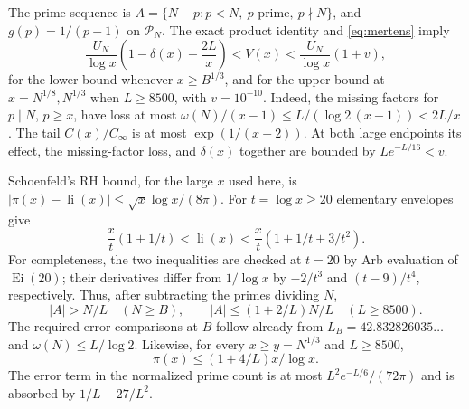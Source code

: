 \documentclass[11pt]{article}
\newcommand{\PP}{\mathcal P_N}
\newcommand{\li}{\operatorname{li}}
\newcommand{\om}{\omega}
\begin{document}
The prime sequence is
$A=\{N-p:p<N,\ p\text{ prime},\ p\nmid N\}$,
and $g(p)=1/(p-1)$ on $\PP$.
The exact product identity and \eqref{eq:mertens} imply
\begin{equation}\label{eq:Vbounds}
\frac{U_N}{\log x}
\left(1-\delta(x)-\frac{2L}{x}\right)
<V(x)
<\frac{U_N}{\log x}(1+v),
\end{equation}
for the lower bound whenever $x\ge B^{1/3}$, and for the upper
bound at $x=N^{1/8},N^{1/3}$ when $L\ge8500$, with $v=10^{-10}$.
Indeed, the missing factors for $p\mid N$, $p\ge x$, have loss
at most $\om(N)/(x-1)\le L/(\log2\,(x-1))<2L/x$.
The tail $C(x)/C_\infty$ is at most $\exp(1/(x-2))$.
At both large endpoints its effect, the missing-factor loss, and
$\delta(x)$ together are bounded by $Le^{-L/16}<v$.

Schoenfeld's RH bound, for the large $x$ used here, is
$|\pi(x)-\li(x)|\le\sqrt x\log x/(8\pi)$.
For $t=\log x\ge20$ elementary envelopes give
\[
\frac{x}{t}(1+1/t)<\li(x)<\frac{x}{t}(1+1/t+3/t^2).
\]
For completeness, the two inequalities are checked at $t=20$ by
Arb evaluation of $\operatorname{Ei}(20)$; their derivatives differ
from $1/\log x$ by $-2/t^3$ and $(t-9)/t^4$, respectively.
Thus, after subtracting the primes dividing $N$,
\begin{equation}\label{eq:A}
|A|>N/L\quad(N\ge B),\qquad
|A|\le(1+2/L)N/L\quad(L\ge8500).
\end{equation}
The required error comparisons at $B$ follow already from
$L_B=42.832826035\ldots$ and $\om(N)\le L/\log2$.
Likewise, for every $x\ge y=N^{1/3}$ and $L\ge8500$,
\begin{equation}\label{eq:piupper}
\pi(x)\le(1+4/L)x/\log x.
\end{equation}
The error term in the normalized prime count is at most
$L^2e^{-L/6}/(72\pi)$ and is absorbed by $1/L-27/L^2$.
\end{document}
